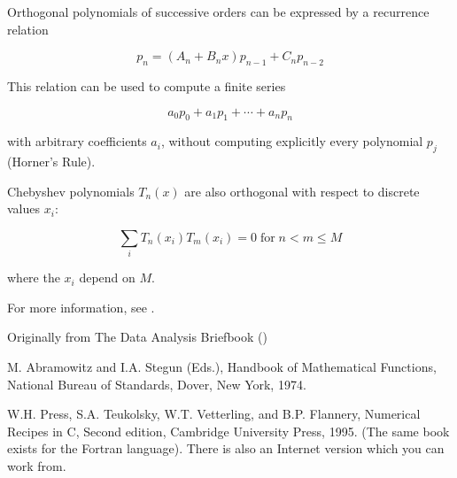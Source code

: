 \documentclass{article}
\begin{document}
Orthogonal polynomials of successive orders can be expressed by a recurrence relation 

$$ p_n = (A_n + B_n x) p_{n-1} + C_n p_{n-2} $$

This relation can be used to compute a finite series

$$ a_0 p_0 + a_1 p_1 + \cdots + a_np_n $$

with arbitrary coefficients $a_i$, without computing explicitly every polynomial $p_j$ (Horner's Rule).

Chebyshev polynomials $T_n(x)$ are also orthogonal with respect to discrete values $x_i$:

$$ \sum_i T_n(x_i)T_m(x_i) = 0 \; \text{for} \; n < m \le M $$

where the $x_i$ depend on $M$.

For more information, see \cite{Abramowitz74, Press95}.

\begin{thebibliography}{3}

 Originally from The Data Analysis Briefbook
()

 M. Abramowitz and I.A. Stegun (Eds.), Handbook of Mathematical Functions, National Bureau of Standards, Dover, New York, 1974.

  W.H. Press, S.A. Teukolsky, W.T. Vetterling, and B.P. Flannery, Numerical Recipes in C, Second edition, Cambridge University Press, 1995. (The same book exists for the Fortran language). There is also an Internet version which you can work from.

\end{thebibliography}
\end{document}
